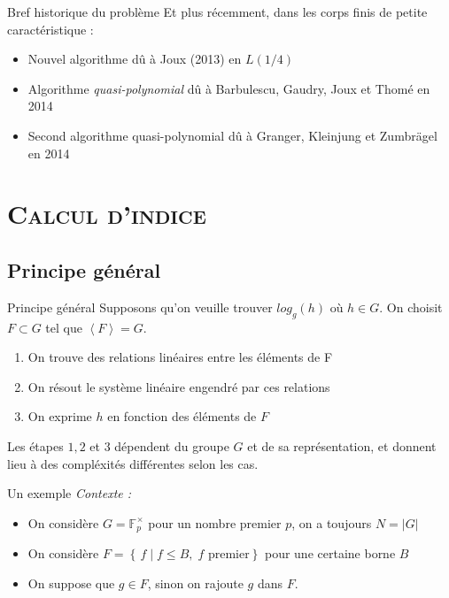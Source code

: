 \documentclass[xcolor=x11names,compress]{beamer}
\theoremstyle{break}
\theoremstyle{sc}
\theoremstyle{definition}
\theoremstyle{remark}
\begin{document}
\begin{frame}{Bref historique du problème}
  Et plus récemment, dans les corps finis de petite caractéristique :
  \begin{itemize}
    \item Nouvel algorithme dû à Joux (2013) en $L(1/4)$
    \item Algorithme \emph{quasi-polynomial} dû à Barbulescu, Gaudry, Joux et
      Thomé en 2014
    \item Second algorithme quasi-polynomial dû à Granger, Kleinjung et
      Zumbrägel en 2014
  \end{itemize}
\end{frame}

\section{\scshape Calcul d'indice}
\subsection{Principe général}
\begin{frame}{Principe général}
  Supposons qu'on veuille trouver $log_g(h)$ où $h\in G$. On choisit $F\subset G$ tel que $\left\langle F \right\rangle = G$.
  \begin{enumerate}
    \item On trouve des relations linéaires entre les éléments de F
    \item On résout le système linéaire engendré par ces relations
    \item On exprime $h$ en fonction des éléments de $F$
  \end{enumerate}
  Les étapes $1, 2$ et $3$ dépendent du groupe $G$ et de sa représentation, et
  donnent lieu à des compléxités différentes selon les cas.
\end{frame}
\begin{frame}{Un exemple}
  \emph{Contexte :}
  \begin{itemize}
    \item On considère $G = \mathbb{F}_p^\times$ pour un nombre premier $p$, on
      a toujours $N = |G|$
    \item On considère $F = \left\{\, f \;|\; f \leq B,\; f \text{ premier} \right\}$ pour
      une certaine borne $B$
    \item On suppose que $g\in F$, sinon on rajoute $g$ dans $F$.
  \end{itemize}
\end{frame}
\end{document}
